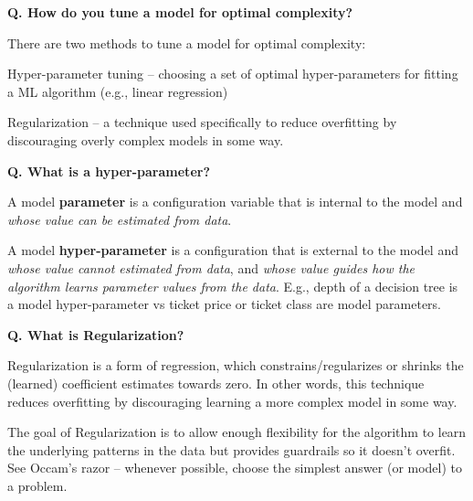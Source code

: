 \begin{frame}[fragile]{\textbf{Q. How do you tune a model for optimal complexity?}}
  \begin{wideitemize}
    \item There are two methods to tune a model for optimal complexity:
    \begin{wideitemize}
      \item Hyper-parameter tuning -- choosing a set of optimal hyper-parameters
      for fitting a ML algorithm (e.g., linear regression)
      \item Regularization -- a technique used specifically to reduce overfitting
      by discouraging overly complex models in some way.
    \end{wideitemize}
  \end{wideitemize}
\end{frame}

\begin{frame}[fragile]{\textbf{Q. What is a hyper-parameter?}}
  \begin{wideitemize}
    \item A model \textbf{parameter} is a configuration variable that
    is internal to the model and \textit{whose value can be estimated from data}.
    \item A model \textbf{hyper-parameter} is a configuration that is external
    to the model and \textit{whose value cannot estimated from data}, and
    \textit{whose value guides how the algorithm learns parameter values from
    the data}. E.g., depth of a decision tree is a model hyper-parameter vs
    ticket price or ticket class are model parameters.
  \end{wideitemize}
\end{frame}

\begin{frame}[fragile]{\textbf{Q. What is Regularization?}}
  \begin{wideitemize}
    \item Regularization is a form of regression, which constrains/regularizes or shrinks
    the (learned) coefficient estimates towards zero. In other words, this technique
    reduces overfitting by discouraging learning a more complex model in some way.
  \end{wideitemize}
  \begin{framed}
    The goal of Regularization is to allow enough flexibility for the algorithm
    to learn the underlying patterns in the data but provides guardrails so it
    doesn't overfit. See Occam's razor -- whenever possible, choose the simplest
    answer (or model) to a problem.
  \end{framed}
\end{frame}

